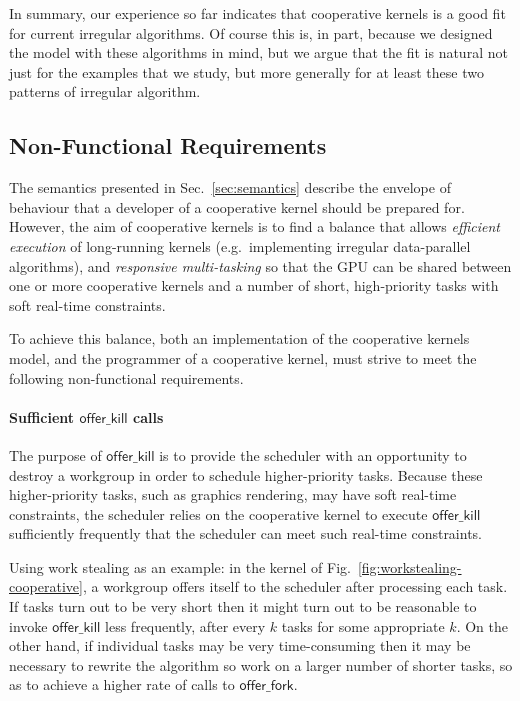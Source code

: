 \documentclass[numbers,nocopyrightspace,10pt]{sigplanconf}
\newcommand{\myfig}{Fig.~}
\newcommand{\mysec}{Sec.~}
\newcommand{\offerfork}{\mathsf{offer\_fork}}
\newcommand{\offerkill}{\mathsf{offer\_kill}}
\begin{document}
In summary, our experience so far indicates that cooperative kernels
is a good fit for current irregular algorithms.  Of course this is, in
part, because we designed the model with these algorithms in mind, but
we argue that the fit is natural not just for the examples that we
study, but more generally for at least these two patterns of irregular
algorithm.


\subsection{Non-Functional Requirements}\label{sec:nonfunctional}

The semantics presented in \mysec\ref{sec:semantics} describe the envelope of
behaviour that a developer of a cooperative kernel should be prepared
for.
%
However, the aim of cooperative kernels is to find a balance that
allows \emph{efficient execution} of long-running kernels
(e.g.\ implementing irregular data-parallel algorithms), and
\emph{responsive multi-tasking} so that the GPU can be shared between
one or more cooperative kernels and a number of short, high-priority
tasks with soft real-time constraints.

To achieve this balance, both an implementation of the cooperative
kernels model, and the programmer of a cooperative kernel, must strive
to meet the following non-functional requirements.

\paragraph{Sufficient $\offerkill$ calls}

The purpose of $\offerkill$ is to provide the scheduler with an
opportunity to destroy a workgroup in order to schedule
higher-priority tasks.  Because these higher-priority tasks, such as
graphics rendering, may have soft real-time constraints, the scheduler
relies on the cooperative kernel to execute $\offerkill$ sufficiently
frequently that the scheduler can meet such real-time constraints.

Using work stealing as an example: in the kernel of \myfig\ref{fig:workstealing-cooperative}, a
workgroup offers itself to the scheduler after processing each task.
If tasks turn out to be very short then it might turn out to be
reasonable to invoke $\offerkill$ less frequently, after every $k$
tasks for some appropriate $k$.  On the other hand, if individual
tasks may be very time-consuming then it may be necessary to rewrite
the algorithm so work on a larger number of shorter tasks, so as to
achieve a higher rate of calls to $\offerfork$.
\end{document}
